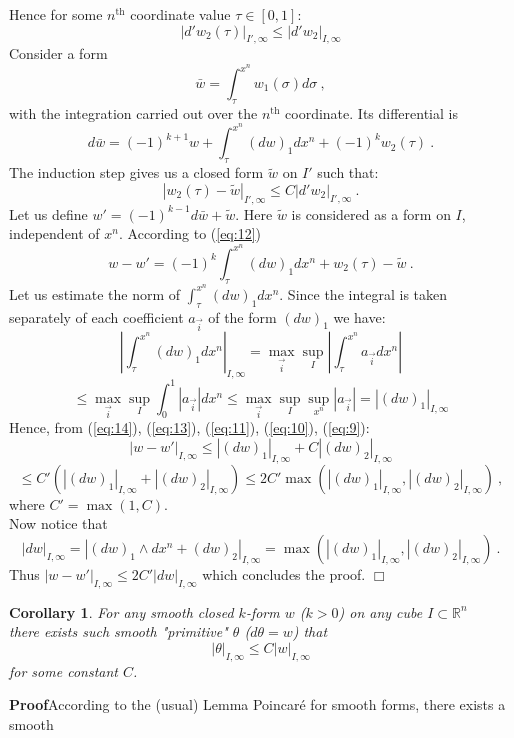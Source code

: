 \documentclass{amsart}%
\newtheorem{cor}[thm]{Corollary}
\begin{document}
Hence for some $n^{\textrm{th}}$ coordinate value $\tau \in
[0,1]$:
\begin{equation}
\label{eq:11} |d'w_2(\tau)|_{I',\infty}\leq |d'w_2|_{I,\infty}
\end{equation}
Consider a form $$\bar{w}=\int_{\tau}^{x^n}w_1(\sigma)d\sigma\ ,$$
with the integration carried out over the $n^{\textrm{th}}$
coordinate. Its differential is
\begin{equation}
\label{eq:12}
d\bar{w}=(-1)^{k+1}w+\int_{\tau}^{x^n}(dw)_1dx^n+(-1)^k w_2(\tau)\
.
\end{equation}
The induction step gives us a closed form $\tilde{w}$ on $I'$ such
that:
\begin{equation}
\label{eq:13} |w_2(\tau)-\tilde{w}|_{I',\infty}\leq
C|d'w_2|_{I',\infty}\ .
\end{equation}
Let us define $w'=(-1)^{k-1}d\bar{w}+\tilde{w}$. Here $\tilde{w}$
is considered as a form on $I$, independent of $x^n$. According to
(\ref{eq:12})
\begin{equation}
\label{eq:14}
w-w'=(-1)^k\int_{\tau}^{x^n}(dw)_1dx^n+w_2(\tau)-\tilde{w}\ .
\end{equation}
Let us estimate the norm of
$\displaystyle{\int_{\tau}^{x^n}(dw)_1dx^n}$. Since the integral
is taken separately of each coefficient $a_{\vec{i}}$ of the form
$(dw)_1$ we have:
$$|\int_{\tau}^{x^n}(dw)_1dx^n|_{I,\infty}=\max_{\vec{i}}\sup_{I}|\int_{\tau}^{x^n}a_{\vec{i}}dx^n|$$
$$\leq \max_{\vec{i}}\sup_{I}\int_{0}^{1}|a_{\vec{i}}|dx^n\leq
\max_{\vec{i}}\sup_{I}\sup_{x^n}|a_{\vec{i}}|=|(dw)_1|_{I,\infty}
$$
Hence, from (\ref{eq:14}), (\ref{eq:13}), (\ref{eq:11}),
(\ref{eq:10}), (\ref{eq:9}):
$$
|w-w'|_{I,\infty}\leq |(dw)_1|_{I,\infty} +
C|(dw)_2|_{I,\infty}$$
$$\leq C'(|(dw)_1|_{I,\infty}
+|(dw)_2|_{I,\infty})\leq 2C'\max(|(dw)_1|_{I,\infty}
,|(dw)_2|_{I,\infty})\ ,
$$ where $C'=\max(1,C)$. \\Now notice that
$$|dw|_{I,\infty}=|(dw)_1\wedge dx^n +
(dw)_2|_{I,\infty}=\max(|(dw)_1|_{I,\infty},|(dw)_2|_{I,\infty})\
.
$$
Thus $|w-w'|_{I,\infty}\leq 2C'|dw|_{I,\infty}$ which concludes
the proof.
 $\Box$
\begin{cor}
\label{cor:3.3} For any smooth closed $k$-form $w$ ($k>0$) on any
cube $I \subset \mathbb{R}^{n}$ \\there exists such smooth
"primitive" $\theta$ ($d\theta=w$) that
$$|\theta|_{I,\infty}\leq C|w|_{I,\infty}
$$
for some constant $C$.\end{cor} {\bf Proof}\quad According to the
(usual) Lemma Poincar\'e for smooth forms, there exists a smooth
\end{document}
